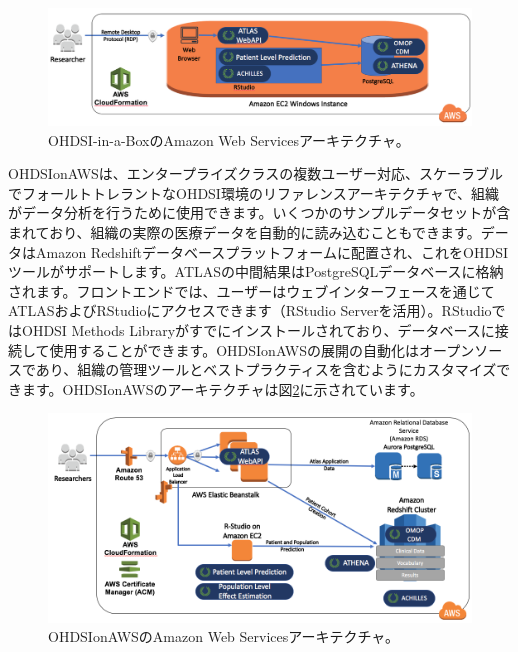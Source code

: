 \documentclass[
  11pt]{book}
\theoremstyle{definition}
\theoremstyle{definition}
\theoremstyle{definition}
\theoremstyle{definition}
\theoremstyle{remark}
\begin{document}
\begin{figure}

{\centering \includegraphics[width=1\linewidth]{images/OhdsiAnalyticsTools/OHDSI-in-a-BoxDiagram} 

}

\caption{OHDSI-in-a-BoxのAmazon Web Servicesアーキテクチャ。}\label{fig:ohdsiinaboxDiagram}
\end{figure}

OHDSIonAWSは、エンタープライズクラスの複数ユーザー対応、スケーラブルでフォールトトレラントなOHDSI環境のリファレンスアーキテクチャで、組織がデータ分析を行うために使用できます。いくつかのサンプルデータセットが含まれており、組織の実際の医療データを自動的に読み込むこともできます。データはAmazon Redshiftデータベースプラットフォームに配置され、これをOHDSIツールがサポートします。ATLASの中間結果はPostgreSQLデータベースに格納されます。フロントエンドでは、ユーザーはウェブインターフェースを通じてATLASおよびRStudioにアクセスできます（RStudio Serverを活用）。RStudioではOHDSI Methods Libraryがすでにインストールされており、データベースに接続して使用することができます。OHDSIonAWSの展開の自動化はオープンソースであり、組織の管理ツールとベストプラクティスを含むようにカスタマイズできます。OHDSIonAWSのアーキテクチャは図\ref{fig:ohdsionawsDiagram}に示されています。

\begin{figure}

{\centering \includegraphics[width=1\linewidth]{images/OhdsiAnalyticsTools/OHDSIonAWSDiagram} 

}

\caption{OHDSIonAWSのAmazon Web Servicesアーキテクチャ。}\label{fig:ohdsionawsDiagram}
\end{figure}
\end{document}
